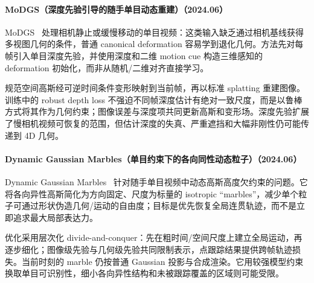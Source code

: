 \paragraph{MoDGS（深度先验引导的随手单目动态重建）（2024.06）}
MoDGS~\cite{2406_00434} 处理相机静止或缓慢移动的单目视频：这类输入缺乏通过相机基线获得多视图几何的条件，普通 canonical deformation 容易学到退化几何。方法先对每帧引入单目深度先验，并使用深度和二维 motion cue 构造三维感知的 deformation 初始化，而非从随机/二维对齐直接学习。

规范空间高斯经可逆时间条件变形映射到当前帧，再以标准 splatting 重建图像。训练中的 robust depth loss 不强迫不同帧深度估计有绝对一致尺度，而是以鲁棒方式将其作为几何约束；图像误差与深度项共同更新高斯和变形场。深度先验扩展了慢相机视频可恢复的范围，但估计深度的失真、严重遮挡和大幅非刚性仍可能传递到 4D 几何。

\paragraph{Dynamic Gaussian Marbles（单目约束下的各向同性动态粒子）（2024.06）}
Dynamic Gaussian Marbles~\cite{2406_18717} 针对随手单目视频中动态高斯高度欠约束的问题。它将各向异性高斯简化为方向固定、尺度为标量的 isotropic ``marbles''，减少单个粒子可通过形状伪造几何/运动的自由度；目标是优先恢复全局连贯轨迹，而不是立即追求最大局部表达力。

优化采用层次化 divide-and-conquer：先在粗时间/空间尺度上建立全局运动，再逐步细化；图像级先验与几何级先验共同限制表示，点跟踪结果提供跨帧轨迹损失。当前时刻的 marble 仍按普通 Gaussian 投影与合成渲染。它用较强模型约束换取单目可识别性，细小各向异性结构和未被跟踪覆盖的区域则可能受限。

